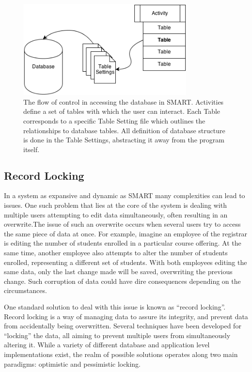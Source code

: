 \documentclass[12pt]{article}
\begin{document}
\begin{figure}[h]
    \vspace{10pt}
    \begin{center}
        \centerline{\includegraphics[width=3.5in]{diagrams/SMARTAccess.png}}
    \end{center}
    \begin{spacing}{1.0}\caption{The flow of control in accessing the database in SMART. Activities define a set of tables with which the user can interact. Each Table corresponds to a specific Table Setting file which outlines the relationships to database tables. All definition of database structure is done in the Table Settings, abstracting it away from the program itself.}\end{spacing}
\end{figure}

\subsection{Record Locking}

In a system as expansive and dynamic as SMART many complexities can lead to issues. One such problem that lies at the core of the system is dealing with multiple users attempting to edit data simultaneously, often resulting in an overwrite.The issue of such an overwrite occurs when several users try to access the same piece of data at once. For example, imagine an employee of the registrar is editing the number of students enrolled in a particular course offering. At the same time, another employee also attempts to alter the number of students enrolled, representing a different set of students. With both employees editing the same data, only the last change made will be saved, overwriting the previous change. Such corruption of data could have dire consequences depending on the circumstances.  

One standard solution to deal with this issue is known as “record locking”. Record locking is a way of managing data to assure its integrity, and prevent data from accidentally being overwritten. Several techniques have been developed for “locking” the data, all aiming to prevent multiple users from simultaneously altering it. While a variety of different database and application level implementations exist, the realm of possible solutions operates along two main paradigms: optimistic and pessimistic locking. 
\end{document}
